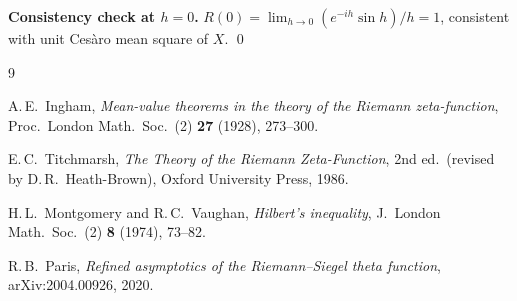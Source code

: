 \documentclass{amsart}
\begin{document}
\noindent\textbf{Consistency check at $h=0$.}\enspace
$R(0) = \lim_{h\to 0}(e^{-ih}\sin h)/h = 1$, consistent with unit
Ces\`aro mean square of $X$. \qed

\begin{thebibliography}{9}

A.\,E.~Ingham,
\textit{Mean-value theorems in the theory of the Riemann zeta-function},
Proc.\ London Math.\ Soc.\ (2) \textbf{27} (1928), 273--300.

E.\,C.~Titchmarsh,
\textit{The Theory of the Riemann Zeta-Function},
2nd ed.\ (revised by D.\,R.~Heath-Brown),
Oxford University Press, 1986.

H.\,L.~Montgomery and R.\,C.~Vaughan,
\textit{Hilbert's inequality},
J.\ London Math.\ Soc.\ (2) \textbf{8} (1974), 73--82.

R.\,B.~Paris,
\textit{Refined asymptotics of the Riemann--Siegel theta function},
arXiv:2004.00926, 2020.

\end{thebibliography}
\end{document}
